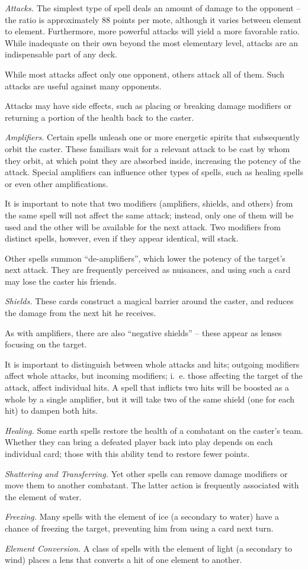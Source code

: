 {	\emph{Attacks.} The simplest type of spell deals an amount of damage to the opponent -- the ratio is approximately 88 points per mote, although it varies between element to element. Furthermore, more powerful attacks will yield a more favorable ratio. While inadequate on their own beyond the most elementary level, attacks are an indispensable part of any deck.
	
	While most attacks affect only one opponent, others attack all of them. Such attacks are useful against many opponents.
	
	Attacks may have side effects, such as placing or breaking damage modifiers or returning a portion of the health back to the caster.
	
	\emph{Amplifiers.} Certain spells unleash one or more energetic spirits that subsequently orbit the caster. These familiars wait for a relevant attack to be cast by whom they orbit, at which point they are absorbed inside, increasing the potency of the attack. Special amplifiers can influence other types of spells, such as healing spells or even other amplifications.
	
	It is important to note that two modifiers (amplifiers, shields, and others) from the same spell will not affect the same attack; instead, only one of them will be used and the other will be available for the next attack. Two modifiers from distinct spells, however, even if they appear identical, will stack.
	
	Other spells summon ``de-amplifiers'', which lower the potency of the target's next attack. They are frequently perceived as nuisances, and using such a card may lose the caster his friends.
	
	\emph{Shields.} These cards construct a magical barrier around the caster, and reduces the damage from the next hit he receives.
	
	As with amplifiers, there are also ``negative shields'' -- these appear as lenses focusing on the target.
	
	It is important to distinguish between whole attacks and hits; outgoing modifiers affect whole attacks, but incoming modifiers; i.~e. those affecting the target of the attack, affect individual hits. A spell that inflicts two hits will be boosted as a whole by a single amplifier, but it will take two of the same shield (one for each hit) to dampen both hits.
	
	\emph{Healing.} Some earth spells restore the health of a combatant on the caster's team. Whether they can bring a defeated player back into play depends on each individual card; those with this ability tend to restore fewer points.
	
	\emph{Shattering and Transferring.} Yet other spells can remove damage modifiers or move them to another combatant. The latter action is frequently associated with the element of water.
	
	\emph{Freezing.} Many spells with the element of ice (a secondary to water) have a chance of freezing the target, preventing him from using a card next turn.
	
	\emph{Element Conversion.} A class of spells with the element of light (a secondary to wind) places a lens that converts a hit of one element to another.
}

